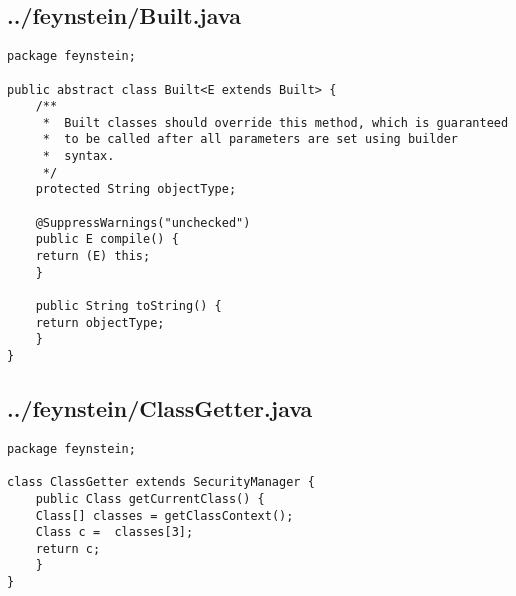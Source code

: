 \subsection*{../feynstein/Built.java}
\begin{lstlisting}
package feynstein;

public abstract class Built<E extends Built> {
    /**
     *  Built classes should override this method, which is guaranteed
     *  to be called after all parameters are set using builder
     *  syntax.
     */
    protected String objectType;

    @SuppressWarnings("unchecked")
    public E compile() {
	return (E) this;
    }

    public String toString() {
	return objectType;
    }
}\end{lstlisting}

\subsection*{../feynstein/ClassGetter.java}
\begin{lstlisting}
package feynstein;

class ClassGetter extends SecurityManager {
    public Class getCurrentClass() {
	Class[] classes = getClassContext();
	Class c =  classes[3];
	return c;
    }
}\end{lstlisting}

